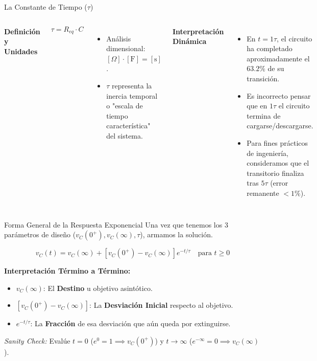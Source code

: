 \documentclass[aspectratio=169, 10pt]{beamer}
\begin{document}
\begin{frame}{La Constante de Tiempo ($\tau$)}
    \begin{columns}[T]
        \textbf{Definición y Unidades}
        \begin{block}{}
            $$\tau = R_{eq} \cdot C$$
        \end{block}
        \begin{itemize}
            \item Análisis dimensional: $[\Omega] \cdot [\text{F}] = [\text{s}]$.
            \item $\tau$ representa la inercia temporal o "escala de tiempo característica" del sistema.
        \end{itemize}

        \textbf{Interpretación Dinámica}
        \begin{itemize}
            \item En $t = 1\tau$, el circuito ha completado aproximadamente el $\mathbf{63.2\%}$ de su transición.
            \item Es incorrecto pensar que en $1\tau$ el circuito termina de cargarse/descargarse.
            \item Para fines prácticos de ingeniería, consideramos que el transitorio finaliza tras \textbf{$5\tau$} (error remanente $< 1\%$).
        \end{itemize}
    \end{columns}
\end{frame}

\begin{frame}{Forma General de la Respuesta Exponencial}
    Una vez que tenemos los 3 parámetros de diseño ($v_C(0^+), v_C(\infty), \tau$), armamos la solución.
    
    \vspace{0.2cm}
    \begin{tcolorbox}[colback=white, colframe=ucbblue, boxrule=0.5pt, arc=1mm]
        $$v_C(t) = v_C(\infty) + \left[ v_C(0^+) - v_C(\infty) \right] e^{-t/\tau} \quad \text{para } t \ge 0$$
    \end{tcolorbox}
    
    \vspace{0.2cm}
    \textbf{Interpretación Término a Término:}
    \begin{itemize}
        \item $v_C(\infty)$: El \textbf{Destino} u objetivo asintótico.
        \item $\left[ v_C(0^+) - v_C(\infty) \right]$: La \textbf{Desviación Inicial} respecto al objetivo.
        \item $e^{-t/\tau}$: La \textbf{Fracción} de esa desviación que aún queda por extinguirse.
    \end{itemize}
    \vspace{0.2cm}
    \textit{Sanity Check:} Evalúe $t=0$ ($e^0=1 \implies v_C(0^+)$) y $t \to \infty$ ($e^{-\infty}=0 \implies v_C(\infty)$).
\end{frame}
\end{document}
